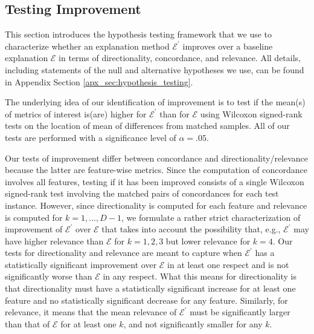 \documentclass[mnsc,blindrev]{informs3}
\newcommand{\mE}{\mathcal{E}}
\begin{document}
    \subsection{Testing Improvement}
        \label{sec:improvement}
        This section introduces the hypothesis testing framework that we use to characterize whether an explanation method $\mE^\prime$ improves over a baseline explanation $\mE$ in terms of directionality, concordance, and relevance. All details, including statements of the null and alternative hypotheses we use, can be found in Appendix Section \ref{apx_sec:hypothesis_testing}.
        
        
        The underlying idea of our identification of improvement is to test if the mean(s) of metrics of interest is(are) higher for $\mE^\prime$ than for $\mE$ using Wilcoxon signed-rank tests on the location of mean of differences from  matched samples.
        All of our tests are performed with a significance level of $\alpha=.05$. 
        
        Our tests of improvement differ between concordance and directionality/relevance because the latter are feature-wise metrics. Since the computation of concordance involves all features, testing if it has been improved consists of a single Wilcoxon signed-rank test involving the matched pairs of concordances for each test instance. However, since directionality is computed for each feature and relevance is computed for $k=1,\ldots,D-1$, we formulate a rather strict characterization of improvement of $\mE^\prime$ over $\mE$ that takes into account the possibility that, e.g., $\mE^\prime$ may have higher relevance than $\mE$ for $k=1,2,3$ but lower relevance for $k=4$. Our tests for directionality and relevance are meant to capture when $\mE^\prime$ has a statistically significant improvement over $\mE$ in at least one respect and is not significantly worse than $\mE$ in any respect. What this means for directionality is that directionality must have a statistically significant increase for at least one feature and no statistically significant decrease for any feature. Similarly, for relevance, it means that the mean relevance of $\mE^\prime$ must be significantly larger than that of $\mE$ for at least one $k$, and not significantly smaller for any $k$.   
        
\end{document}
